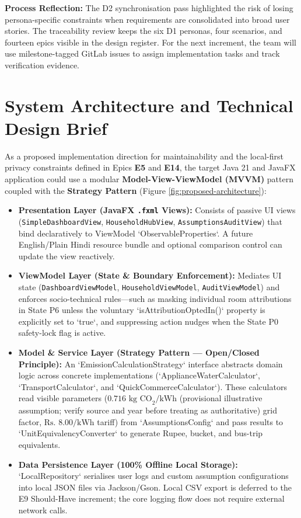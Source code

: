 \documentclass[12pt, a4paper]{article}
\begin{document}
\textbf{Process Reflection:} The D2 synchronisation pass highlighted the risk of losing persona-specific constraints when requirements are consolidated into broad user stories. The traceability review keeps the six D1 personas, four scenarios, and fourteen epics visible in the design register. For the next increment, the team will use milestone-tagged GitLab issues to assign implementation tasks and track verification evidence.

\section{System Architecture and Technical Design Brief}
As a proposed implementation direction for maintainability and the local-first privacy constraints defined in Epics \textbf{E5} and \textbf{E14}, the target Java 21 and JavaFX application could use a modular \textbf{Model-View-ViewModel (MVVM)} pattern coupled with the \textbf{Strategy Pattern} (Figure \ref{fig:proposed-architecture}):

\begin{itemize}
    \item \textbf{Presentation Layer (JavaFX \texttt{.fxml} Views):} Consists of passive UI views (\texttt{SimpleDashboardView}, \texttt{HouseholdHubView}, \texttt{AssumptionsAuditView}) that bind declaratively to ViewModel `ObservableProperties`. A future English/Plain Hindi resource bundle and optional comparison control can update the view reactively.
    \item \textbf{ViewModel Layer (State \& Boundary Enforcement):} Mediates UI state (\texttt{DashboardViewModel}, \texttt{HouseholdViewModel}, \texttt{AuditViewModel}) and enforces socio-technical rules—such as masking individual room attributions in State P6 unless the voluntary `isAttributionOptedIn()` property is explicitly set to `true`, and suppressing action nudges when the State P0 safety-lock flag is active.
    \item \textbf{Model \& Service Layer (Strategy Pattern --- Open/Closed Principle):} An `EmissionCalculationStrategy` interface abstracts domain logic across concrete implementations (`ApplianceWaterCalculator`, `TransportCalculator`, and `QuickCommerceCalculator`). These calculators read visible parameters ($0.716\text{ kg CO}_2\text{/kWh}$ (provisional illustrative assumption; verify source and year before treating as authoritative) grid factor, $\text{Rs. }8.00\text{/kWh}$ tariff) from `AssumptionsConfig` and pass results to `UnitEquivalencyConverter` to generate Rupee, bucket, and bus-trip equivalents.
    \item \textbf{Data Persistence Layer (100\% Offline Local Storage):} `LocalRepository` serialises user logs and custom assumption configurations into local JSON files via Jackson/Gson. Local CSV export is deferred to the E9 Should-Have increment; the core logging flow does not require external network calls.
\end{itemize}
\end{document}
